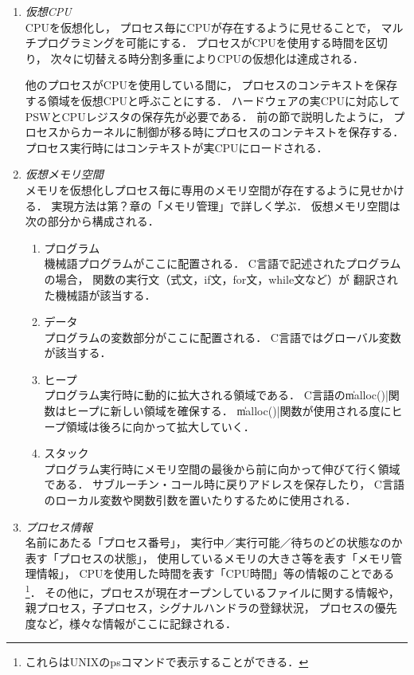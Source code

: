 \begin{enumerate}
\item \emph{仮想CPU} \\
  CPUを仮想化し，
  プロセス毎にCPUが存在するように見せることで，
  マルチプログラミングを可能にする．
  プロセスがCPUを使用する時間を区切り，
  次々に切替える時分割多重によりCPUの仮想化は達成される．

  他のプロセスがCPUを使用している間に，
  プロセスのコンテキストを保存する領域を仮想CPUと呼ぶことにする．
  ハードウェアの実CPUに対応してPSWとCPUレジスタの保存先が必要である．
  前の節で説明したように，
  プロセスからカーネルに制御が移る時にプロセスのコンテキストを保存する．
  プロセス実行時にはコンテキストが実CPUにロードされる．
\item \emph{仮想メモリ空間} \\
  メモリを仮想化しプロセス毎に専用のメモリ空間が存在するように見せかける．
  実現方法は第？章の「メモリ管理」で詳しく学ぶ．
  仮想メモリ空間は次の部分から構成される．
  \begin{enumerate}
  \item プログラム \\
    機械語プログラムがここに配置される．
    C言語で記述されたプログラムの場合，
    関数の実行文（式文，if文，for文，while文など）が
    翻訳された機械語が該当する．
  \item データ \\
    プログラムの変数部分がここに配置される．
    C言語ではグローバル変数が該当する．
  \item ヒープ \\
    プログラム実行時に動的に拡大される領域である．
    C言語の\|malloc()|関数はヒープに新しい領域を確保する．
    \|malloc()|関数が使用される度にヒープ領域は後ろに向かって拡大していく．
  \item スタック \\
    プログラム実行時にメモリ空間の最後から前に向かって伸びて行く領域である．
    サブルーチン・コール時に戻りアドレスを保存したり，
    C言語のローカル変数や関数引数を置いたりするために使用される．
  \end{enumerate}
\item \emph{プロセス情報} \\
  名前にあたる「プロセス番号」，
  実行中／実行可能／待ちのどの状態なのか表す「プロセスの状態」，
  使用しているメモリの大きさ等を表す「メモリ管理情報」，
  CPUを使用した時間を表す「CPU時間」等の情報のことである\footnote{
    これらはUNIXのpsコマンドで表示することができる．}．
  その他に，プロセスが現在オープンしているファイルに関する情報や，
  親プロセス，子プロセス，シグナルハンドラの登録状況，
  プロセスの優先度など，様々な情報がここに記録される．
\end{enumerate}

